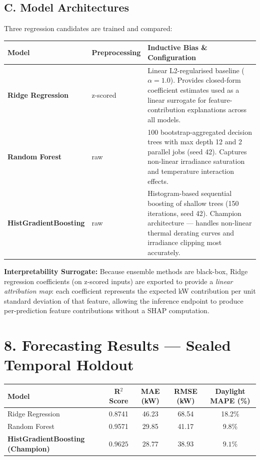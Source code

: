 \documentclass[10pt,a4paper]{article}
\begin{document}
\subsection*{C. Model Architectures}
Three regression candidates are trained and compared:

\vspace{3pt}
\begin{center}
\small
\begin{tabular}{@{}llp{9cm}@{}}
\toprule
\textbf{Model} & \textbf{Preprocessing} & \textbf{Inductive Bias \& Configuration} \\ \midrule
\textbf{Ridge Regression} & z-scored & Linear L2-regularised baseline ($\alpha = 1.0$). Provides closed-form coefficient estimates used as a linear surrogate for feature-contribution explanations across all models. \\[4pt]
\textbf{Random Forest} & raw & 100 bootstrap-aggregated decision trees with max depth 12 and 2 parallel jobs (seed 42). Captures non-linear irradiance saturation and temperature interaction effects. \\[4pt]
\textbf{HistGradientBoosting} & raw & Histogram-based sequential boosting of shallow trees (150 iterations, seed 42). Champion architecture — handles non-linear thermal derating curves and irradiance clipping most accurately. \\ \bottomrule
\end{tabular}
\end{center}

\vspace{3pt}
\noindent\textbf{Interpretability Surrogate:} Because ensemble methods are black-box, Ridge regression coefficients (on z-scored inputs) are exported to provide a \textit{linear attribution map}: each coefficient represents the expected kW contribution per unit standard deviation of that feature, allowing the inference endpoint to produce per-prediction feature contributions without a SHAP computation.

\section*{8. Forecasting Results — Sealed Temporal Holdout}

\vspace{3pt}
\begin{center}
\small
\begin{tabular}{@{}lcccc@{}}
\toprule
\textbf{Model} & \textbf{R$^2$ Score} & \textbf{MAE (kW)} & \textbf{RMSE (kW)} & \textbf{Daylight MAPE (\%)} \\ \midrule
Ridge Regression          & 0.8741 & 46.23 & 68.54  & 18.2\% \\
Random Forest             & 0.9571 & 29.85 & 41.17  &  9.8\% \\
\textbf{HistGradientBoosting (Champion)} & $\mathbf{0.9625}$ & $\mathbf{28.77}$ & $\mathbf{38.93}$ & $\mathbf{9.1\%}$ \\ \bottomrule
\end{tabular}
\end{center}
\vspace{2pt}
\end{document}
